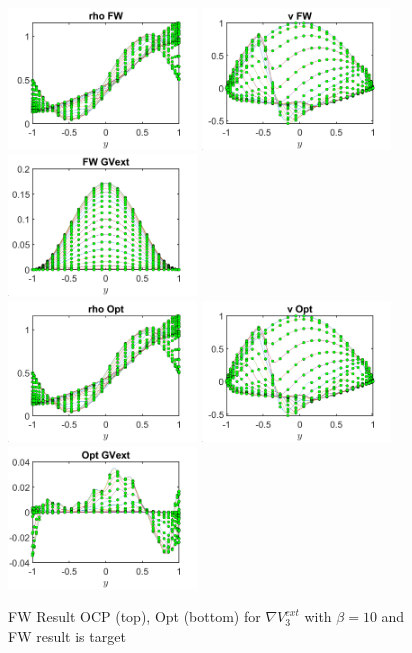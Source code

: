 \documentclass[11pt, a4paper]{article}
\theoremstyle{definition}
\begin{document}
\begin{figure}
	\includegraphics[width=5cm]{FWrho3.png}
	\includegraphics[width=5cm]{FWv3.png}
	\includegraphics[width=5cm]{FWCont3.png}\\
	\includegraphics[width=5cm]{Optrho3.png}
	\includegraphics[width=5cm]{Optv3.png}
	\includegraphics[width=5cm]{OptCont3.png}
	\caption{FW Result OCP (top), Opt (bottom) for $\nabla V^{ext}_3 $ with $\beta =10$ and FW result is target}
	\label{Figure9}
\end{figure}
\end{document}
